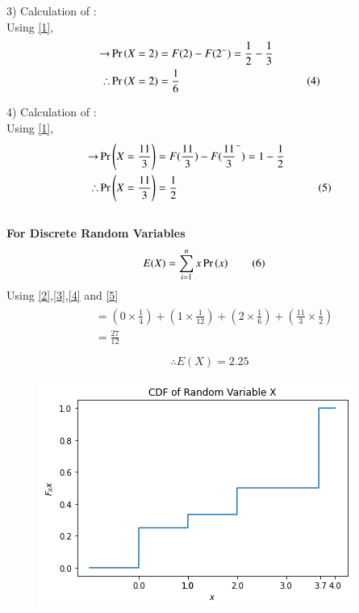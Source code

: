 \documentclass[journal,12pt,twocolumn]{IEEEtran}
\begin{document}
3) Calculation of : \\[2mm]
Using \eqref{1},
\begin{align*}
\rightarrow &\Pr\left(X=2\right)=F(2)-F(2^-)=\frac{1}{2}-\frac{1}{3}& \\
\therefore &\Pr\left(X=2\right)=\frac{1}{6}& \tag{4} \label{4} 
\end{align*}

4) Calculation of : \\[2mm]
Using \eqref{1},
\begin{align*}
\rightarrow &\Pr\left(X=\frac{11}{3}\right)=F(\frac{11}{3})-F({\frac{11}{3}}^-)=1-\frac{1}{2}& \\
\therefore &\Pr\left(X=\frac{11}{3}\right)=\frac{1}{2}& \tag{5} \label{5} 
\end{align*}
\\
\textbf{For Discrete Random Variables}
\begin{align*}
E(X)&=\sum_{i=1}^{n} x\Pr\left(x\right) \tag{6} \label{6}
\end{align*}
Using \eqref{2},\eqref{3},\eqref{4} and \eqref{5}
\begin{align*}
\begin{split}
    &=(0\times \frac{1}{4})+(1\times \frac{1}{12})+(2\times \frac{1}{6})+(\frac{11}{3}\times \frac{1}{2}) \\
    &=\frac{27}{12} \\
\end{split}
\end{align*}
\begin{align*}
\therefore E(X)=2.25 \tag{7} \label{7}
\end{align*}
\newpage
\begin{figure}[ht]
    \centering
    \includegraphics[width=\columnwidth]{CDF.png}
    \label{fig:1}
\end{figure}
\end{document}

